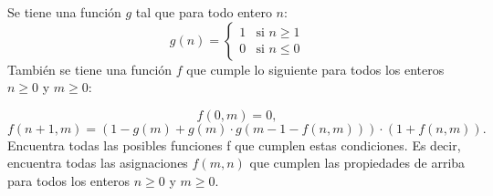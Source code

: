 Se tiene una función $g$ tal que para todo entero $n$:
\[g(n) = \begin{cases}  1  & \text{si } n\geq 1 \\  0  & \text{si } n\leq 0 \end{cases}\]
También se tiene una función $f$ que cumple lo siguiente para todos los enteros $n \geq 0$ y $m \geq 0$:

\[f(0,m)= 0,\]
\[f(n+1,m)=\left(1-g(m)+g(m)\cdot g(m-1-f(n,m))\right)\cdot\left(1+f(n,m)\right).\]
Encuentra todas las posibles funciones f que cumplen estas condiciones. Es decir, encuentra todas las asignaciones $f (m, n)$ que cumplen las propiedades de arriba para todos los enteros $n \geq 0$ y $m \geq 0$.